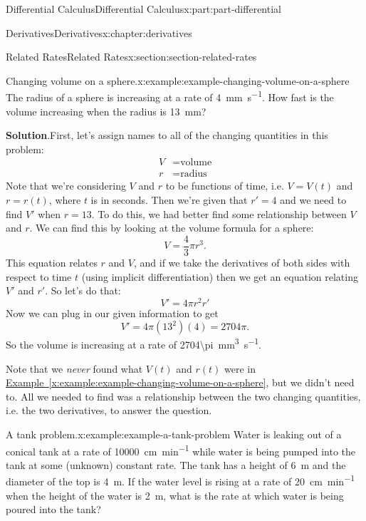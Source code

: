 \documentclass[twoside,10pt,]{tufte-book}
\newcommand{\blocktitlefont}{\relax}
\newcommand{\xreffont}{\relax}
\numberwithin{equation}{part}
\begin{document}
\begin{partptx}{Differential Calculus}{}{Differential Calculus}{}{}{x:part:part-differential}
\begin{chapterptx}{Derivatives}{}{Derivatives}{}{}{x:chapter:derivatives}
\typeout{************************************************}
%
\begin{sectionptx}{Related Rates}{}{Related Rates}{}{}{x:section:section-related-rates}
\begin{example}{Changing volume on a sphere.}{x:example:example-changing-volume-on-a-sphere}%
The radius of a sphere is increasing at a rate of \SI{4}{\milli\meter\per\second}. How fast is the volume increasing when the radius is \SI{13}{\milli\meter}?%
\par\smallskip%
\noindent\textbf{\blocktitlefont Solution}.\hypertarget{g:solution:idm35150998627264}{}\quad{}First, let's assign names to all of the changing quantities in this problem:%
\begin{align*}
V & = \text{volume} \\
r & = \text{radius} 
\end{align*}
Note that we're considering \(V\) and \(r\) to be functions of time, i.e. \(V = V(t)\) and \(r=r(t)\), where \(t\) is in seconds. Then we're given that \(r' = 4\) and we need to find \(V'\) when \(r=13\). To do this, we had better find some relationship between \(V\) and \(r\). We can find this by looking at the volume formula for a sphere:%
\begin{equation*}
V = \frac{4}{3}\pi r^{3}.
\end{equation*}
This equation relates \(r\) and \(V\), and if we take the derivatives of both sides with respect to time \(t\) (using implicit differentiation) then we get an equation relating \(V'\) and \(r'\). So let's do that:%
\begin{equation*}
V' = 4\pi r^{2}r'
\end{equation*}
Now we can plug in our given information to get%
\begin{equation*}
V' = 4\pi(13^{2})(4) = 2704\pi.
\end{equation*}
So the volume is increasing at a rate of \SI{2704\pi}{\milli\meter\tothe{3}\per\second}.%
\end{example}
Note that we \emph{never} found what \(V(t)\) and \(r(t)\) were in \hyperref[x:example:example-changing-volume-on-a-sphere]{Example~{\xreffont\ref{x:example:example-changing-volume-on-a-sphere}}}, but we didn't need to. All we needed to find was a relationship between the two changing quantities, i.e. the two derivatives, to answer the question.%
\begin{example}{A tank problem.}{x:example:example-a-tank-problem}%
Water is leaking out of a conical tank at a rate of \SI{10000}{\centi\meter\per\minute} while water is being pumped into the tank at some (unknown) constant rate. The tank has a height of \SI{6}{\meter} and the diameter of the top is \SI{4}{\meter}. If the water level is rising at a rate of \SI{20}{\centi\meter\per\minute} when the height of the water is \SI{2}{\meter}, what is the rate at which water is being poured into the tank?%

\end{example}
\end{sectionptx}
\end{chapterptx}
\end{partptx}
\end{document}
